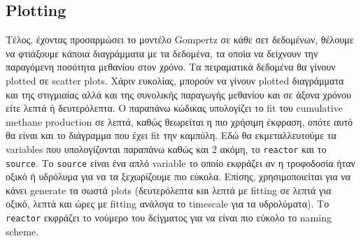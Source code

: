 \documentclass[11pt]{article}
\begin{document}
\subsection{Plotting}
\label{sec:org4c5310e}
Τέλος, έχοντας προσαρμώσει το μοντέλο Gompertz σε κάθε σετ δεδομένων, θέλουμε να φτιάξουμε κάποια διαγράμματα με τα δεδομένα, τα οποία να δείχνουν την παραγόμενη ποσότητα μεθανίου στον χρόνο. Τα πειραματικά δεδομένα θα γίνουν plotted σε scatter plots. Χάριν ευκολίας, μπορούν να γίνουν plotted διαγράμματα και της στιγμιαίας αλλά και της συνολικής παραγωγής μεθανίου και σε άξονα χρόνου είτε λεπτά ή δευτερόλεπτα. Ο παραπάνω κώδικας υπολογίζει το fit του cumulative methane production σε λεπτά, καθώς θεωρείται η πιο χρήσιμη έκφραση, οπότε αυτό θα είναι και το διάγραμμα που έχει fit την καμπύλη. Εδώ θα εκμεταλλευτούμε τα variables που υπολογίζονται παραπάνω καθώς και 2 ακόμη, το \texttt{reactor} και το \texttt{source}. Το \texttt{source} είναι ένα απλό variable το οποίο εκφράζει αν η τροφοδοσία ήταν οξικό ή υδρόλυμα για να τα ξεχωρίζουμε πιο εύκολα. Επίσης, χρησιμοποιείται για να κάνει generate τα σωστά plots (δευτερόλεπτα και λεπτά με fitting σε λεπτά για οξικό, λεπτά και ώρες με fitting ανάλογα το timescale για τα υδρολύματα). Το \texttt{reactor} εκφράζει το νούμερο του δείγματος για να είναι πιο εύκολο το naming scheme.
\end{document}
